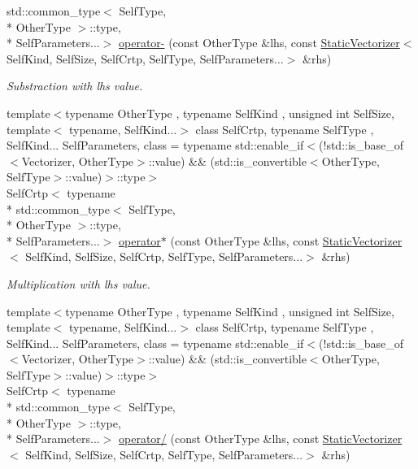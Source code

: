 \begin{DoxyCompactItemize}
std\-::common\-\_\-type$<$ Self\-Type, \\*
Other\-Type $>$\-::type, \\*
Self\-Parameters...$>$ \hyperlink{namespacemagrathea_a56a366b62738a6fa7747b6144b1b3702}{operator-\/} (const Other\-Type \&lhs, const \hyperlink{classmagrathea_1_1StaticVectorizer}{Static\-Vectorizer}$<$ Self\-Kind, Self\-Size, Self\-Crtp, Self\-Type, Self\-Parameters...$>$ \&rhs)
\begin{DoxyCompactList}\small\item\em Substraction with lhs value. \end{DoxyCompactList}\item 
{\footnotesize template$<$typename Other\-Type , typename Self\-Kind , unsigned int Self\-Size, template$<$ typename, Self\-Kind...$>$ class Self\-Crtp, typename Self\-Type , Self\-Kind... Self\-Parameters, class  = typename std\-::enable\-\_\-if$<$(!std\-::is\-\_\-base\-\_\-of$<$\-Vectorizer, Other\-Type$>$\-::value) \&\& (std\-::is\-\_\-convertible$<$\-Other\-Type, Self\-Type$>$\-::value)$>$\-::type$>$ }\\Self\-Crtp$<$ typename \\*
std\-::common\-\_\-type$<$ Self\-Type, \\*
Other\-Type $>$\-::type, \\*
Self\-Parameters...$>$ \hyperlink{namespacemagrathea_ab6ac48b0d4f57eff39cd9e0053b98a47}{operator$\ast$} (const Other\-Type \&lhs, const \hyperlink{classmagrathea_1_1StaticVectorizer}{Static\-Vectorizer}$<$ Self\-Kind, Self\-Size, Self\-Crtp, Self\-Type, Self\-Parameters...$>$ \&rhs)
\begin{DoxyCompactList}\small\item\em Multiplication with lhs value. \end{DoxyCompactList}\item 
{\footnotesize template$<$typename Other\-Type , typename Self\-Kind , unsigned int Self\-Size, template$<$ typename, Self\-Kind...$>$ class Self\-Crtp, typename Self\-Type , Self\-Kind... Self\-Parameters, class  = typename std\-::enable\-\_\-if$<$(!std\-::is\-\_\-base\-\_\-of$<$\-Vectorizer, Other\-Type$>$\-::value) \&\& (std\-::is\-\_\-convertible$<$\-Other\-Type, Self\-Type$>$\-::value)$>$\-::type$>$ }\\Self\-Crtp$<$ typename \\*
std\-::common\-\_\-type$<$ Self\-Type, \\*
Other\-Type $>$\-::type, \\*
Self\-Parameters...$>$ \hyperlink{namespacemagrathea_ade4a187c4aa140e2690c28b2e00575cc}{operator/} (const Other\-Type \&lhs, const \hyperlink{classmagrathea_1_1StaticVectorizer}{Static\-Vectorizer}$<$ Self\-Kind, Self\-Size, Self\-Crtp, Self\-Type, Self\-Parameters...$>$ \&rhs)

\end{DoxyCompactItemize}
